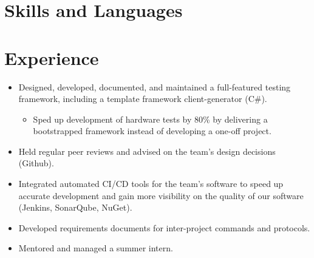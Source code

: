 \documentclass[10pt,letterpaper,sans]{moderncv}   %
\begin{document}
\makecvtitle


\section{Skills and Languages}
\vspace*{-3mm}

\section{Experience}

{ {}
\begin{itemize}
    \item Designed, developed, documented, and maintained a full-featured testing framework, including a template framework client-generator (C\#).
    \begin{itemize}
        \item Sped up development of hardware tests by 80\% by delivering a bootstrapped framework instead of developing a one-off project.
    \end{itemize}
    \item Held regular peer reviews and advised on the team's design decisions (Github).
    \item Integrated automated CI/CD tools for the team's software to speed up accurate development and gain more visibility on the quality of our software (Jenkins, SonarQube, NuGet).
    \item Developed requirements documents for inter-project commands and protocols.
    \item Mentored and managed a summer intern.
\end{itemize}}
\end{document}
